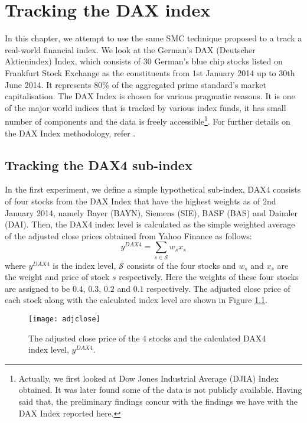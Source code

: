 \chapter{Tracking the DAX index}
\graphicspath{{Chapter4/figures/}}
\label{cha:dax}
In this chapter, we attempt to use the same SMC technique proposed to a track a real-world financial index. We look at the German's DAX (Deutscher Aktienindex) Index, which consists of 30 German's blue chip stocks listed on Frankfurt Stock Exchange as the constituents from 1st January 2014 up to 30th June 2014. It represents $80\%$ of the aggregated prime standard's market capitalisation. The DAX Index is chosen for various pragmatic reasons. It is one of the major world indices that is tracked by various index funds, it has small number of components and the data is freely accessible\footnote{Actually, we first looked at Dow Jones Industrial Average (DJIA) Index obtained. It was later found some of the data is not publicly available. Having said that, the preliminary findings concur with the findings we have with the DAX Index reported here.}. For further details on the DAX Index methodology, refer \cite{DAX14}.
 
\section{Tracking the DAX4 sub-index}
In the first experiment, we define a simple hypothetical sub-index, DAX4 consists of four stocks from the DAX Index that have the highest weights as of 2nd January 2014, namely Bayer (BAYN), Siemens (SIE), BASF (BAS) and Daimler (DAI). Then, the DAX4 index level is calculated as the simple weighted average of the adjusted close prices obtained from Yahoo Finance as follows:
\begin{equation}
  y^{DAX4} = \sum_{s \in \mathcal{S}} w_s x_s
\end{equation}
where $y^{DAX4}$ is the index level, $\mathcal{S}$ consists of the four stocks and  $w_s$ and $x_s$ are the weight and price of stock $s$ respectively. Here the weights of these four stocks are assigned to be $0.4$, $0.3$, $0.2$ and $0.1$ respectively. The adjusted close price of each stock along with the calculated index level are shown in Figure \ref{fig:adjclose}.
 
\begin{figure}[!thbp]
\centering
\texttt{[image: adjclose]}
\caption{The adjusted close price of the 4 stocks and the calculated DAX4 index level, $y^{DAX4}$.}
\label{fig:adjclose}
\end{figure}
 
